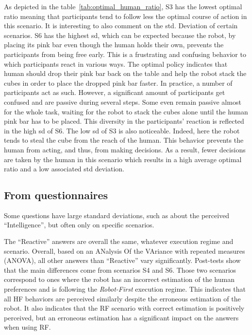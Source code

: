As depicted in the table~\ref{tab:optimal_human_ratio}, S3 has the lowest optimal ratio meaning that participants tend to follow less the optimal course of action in this scenario. It is interesting to also comment on the std. Deviation of certain scenarios. S6 has the highest sd, which can be expected because the robot, by placing its pink bar even though the human holds their own, prevents the participants from being free early. This is a frustrating and confusing behavior to which participants react in various ways. The optimal policy indicates that human should drop their pink bar back on the table and help the robot stack the cubes in order to place the dropped pink bar faster. In practice, a number of participants act as such. However, a significant amount of participants get confused and are passive during several steps. Some even remain passive almost for the whole task, waiting for the robot to stack the cubes alone until the human pink bar has to be placed. This diversity in the participants' reaction is reflected in the high sd of S6.
The low sd of S3 is also noticeable. Indeed, here the robot tends to steal the cube from the reach of the human. This behavior prevents the human from acting, and thus, from making decisions. As a result, fewer decisions are taken by the human in this scenario which results in a high average optimal ratio and a low associated std deviation. 

\subsection{From questionnaires}

Some questions have large standard deviations, such as about the perceived ``Intelligence'', but often only on specific scenarios.

The ``Reactive'' answers are overall the same, whatever execution regime and scenario. 
Overall, based on an ANalysis Of the VAriance with repeated measures (ANOVA), all other answers than ``Reactive'' vary significantly. Post-tests show that the main differences come from scenarios S4 and S6. Those two scenarios correspond to ones where the robot has an incorrect estimation of the human preferences and is following the \textit{Robot-First} execution regime. This indicates that all HF behaviors are perceived similarly despite the erroneous estimation of the robot. It also indicates that the RF scenario with correct estimation is positively perceived, but an erroneous estimation has a significant impact on the answers when using RF.  

